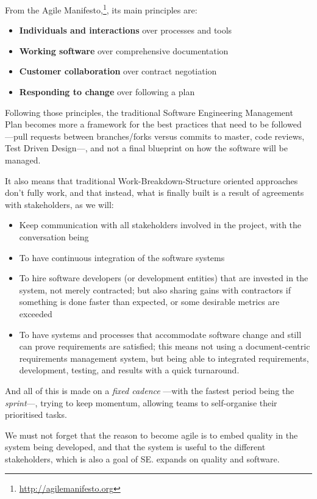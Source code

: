 \documentclass[11pt,twoside]{article}
\begin{document}
From the Agile Manifesto,\footnote{\url{http://agilemanifesto.org}}, its main principles are:

\begin{itemize}
	\item \textbf{Individuals and interactions} over processes and tools
	\item \textbf{Working software} over comprehensive documentation
	\item \textbf{Customer collaboration} over contract negotiation
	\item \textbf{Responding to change} over following a plan	
\end{itemize}

Following those principles, the traditional Software Engineering Management Plan becomes more a framework for the best practices that need to be followed ---pull requests between branches/forks versus commits to master, code reviews, Test Driven Design---, and not a final blueprint on how the software will be managed.

It also means that traditional Work-Breakdown-Structure oriented approaches don't fully work, and that instead, what is finally built is a result of agreements with stakeholders, as we will:
\begin{itemize}
	\item Keep communication with all stakeholders involved in the project, with the conversation being 	
	\item To have continuous integration of the software systems	
	\item To hire software developers (or development entities) that are invested in the system, not merely contracted; but also sharing gains with contractors if something is done faster than expected, or some desirable metrics are exceeded	
	\item To have systems and processes that accommodate software change and still can prove requirements are satisfied; this means not using a document-centric requirements management system, but being able to integrated requirements, development, testing, and results with a quick turnaround.	
\end{itemize}

And all of this is made on a \emph{fixed cadence} ---with the fastest period being the \emph{sprint}---, trying to keep momentum, allowing teams to self-organise their prioritised tasks.

We must not forget that the reason to become agile is to embed quality in the system being developed, and that the system is useful to the different stakeholders, which is also a goal of SE. \citet{I10-1_adassxxvii} expands on quality and software.
\end{document}
